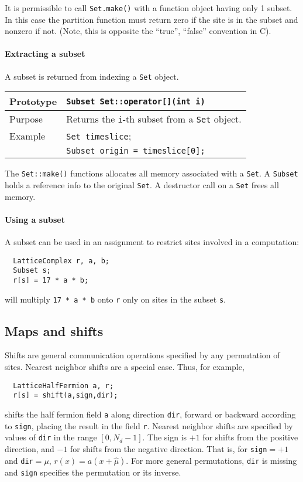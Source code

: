 \documentclass[12pt,letterpaper]{article}
\begin{document}
It is permissible to call \verb|Set.make()| with a function object
having only 1 subset.  In this case the partition function must return
zero if the site is in the subset and nonzero if not.  (Note, this is
opposite the ``true'', ``false'' convention in C).

\paragraph{Extracting a subset}

A subset is returned from indexing a \verb|Set| object.

\begin{flushleft}
  \begin{tabular}{|l|l|}
  \hline
  Prototype    & \verb|Subset Set::operator[](int i)| \\
    \hline
Purpose        & Returns the \verb|i|-th subset from a \verb|Set| object.\\
    \hline
Example  & \verb|Set timeslice|; \\
         & \verb|Subset origin = timeslice[0];| \\
   \hline
  \end{tabular}
\end{flushleft}

The \verb|Set::make()| functions allocates all memory associated with
a \verb|Set|. A \verb|Subset| holds a reference info to the original
\verb|Set|. A destructor call on a \verb|Set| frees all memory.

\paragraph{Using a subset}

A subset can be used in an assignment to restrict sites involved in
a computation:
%
\begin{verbatim}
  LatticeComplex r, a, b;
  Subset s;
  r[s] = 17 * a * b;
\end{verbatim}
%
will multiply {\tt 17 * a * b} onto {\tt r} only on sites in the 
subset {\tt s}.

\subsection{Maps and shifts}
\label{sec:shifts}

Shifts are general communication operations specified by any
permutation of sites.  Nearest neighbor shifts are a special case.
Thus, for example,
%
\begin{verbatim}
  LatticeHalfFermion a, r;
  r[s] = shift(a,sign,dir);
\end{verbatim}
%
shifts the half fermion field {\tt a} along direction {\tt dir},
forward or backward according to {\tt sign}, placing the result in the
field {\tt r}.  Nearest neighbor shifts are specified by values of
{\tt dir} in the range $[0,N_d-1]$.  The sign is $+1$ for shifts from
the positive direction, and $-1$ for shifts from the negative
direction.  That is, for {\tt sign}$= +1$ and {\tt dir}$= \mu$, $r(x)
= a(x+\hat \mu)$. For more general permutations, {\tt dir} is missing
and {\tt sign} specifies the permutation or its inverse.
\end{document}
